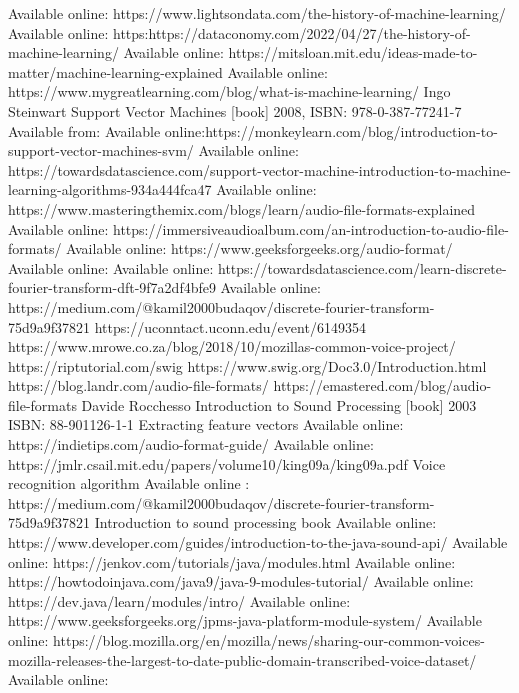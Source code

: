 \documentclass[english,12pt,oneside,a4paper]{article}
\begin{document}
\begin{center}
	\begin{thebibliography}{15}
		Available online: https://www.lightsondata.com/the-history-of-machine-learning/
		Available online: https:https://dataconomy.com/2022/04/27/the-history-of-machine-learning/
		Available online: https://mitsloan.mit.edu/ideas-made-to-matter/machine-learning-explained
		Available online: https://www.mygreatlearning.com/blog/what-is-machine-learning/
		Ingo Steinwart Support Vector Machines [book] 2008, ISBN: 978-0-387-77241-7
		Available from: 
		Available online:https://monkeylearn.com/blog/introduction-to-support-vector-machines-svm/
		Available online: https://towardsdatascience.com/support-vector-machine-introduction-to-machine-learning-algorithms-934a444fca47
		Available online:
		https://www.masteringthemix.com/blogs/learn/audio-file-formats-explained
		Available online: 
		https://immersiveaudioalbum.com/an-introduction-to-audio-file-formats/
		Available online:
		https://www.geeksforgeeks.org/audio-format/
		Available online:
		Available online:
		https://towardsdatascience.com/learn-discrete-fourier-transform-dft-9f7a2df4bfe9
		Available online:
		https://medium.com/@kamil2000budaqov/discrete-fourier-transform-75d9a9f37821
		https://uconntact.uconn.edu/event/6149354
		https://www.mrowe.co.za/blog/2018/10/mozillas-common-voice-project/
		https://riptutorial.com/swig
		https://www.swig.org/Doc3.0/Introduction.html
		https://blog.landr.com/audio-file-formats/
		https://emastered.com/blog/audio-file-formats
		Davide Rocchesso Introduction to Sound Processing [book] 2003\\ ISBN: 88-901126-1-1
		Extracting feature vectors
		Available online: https://indietips.com/audio-format-guide/
		 Available online:
		 https://jmlr.csail.mit.edu/papers/volume10/king09a/king09a.pdf
		 Voice recognition algorithm
		 Available online : https://medium.com/@kamil2000budaqov/discrete-fourier-transform-75d9a9f37821
		Introduction to sound processing book
		Available online: https://www.developer.com/guides/introduction-to-the-java-sound-api/
		Available online:
		https://jenkov.com/tutorials/java/modules.html
		Available online:
		https://howtodoinjava.com/java9/java-9-modules-tutorial/
		Available online:
		https://dev.java/learn/modules/intro/
		Available online:
		https://www.geeksforgeeks.org/jpms-java-platform-module-system/
		Available online:
		https://blog.mozilla.org/en/mozilla/news/sharing-our-common-voices-mozilla-releases-the-largest-to-date-public-domain-transcribed-voice-dataset/
		Available online:
		
	\end{thebibliography}
\end{center}
\end{document}
